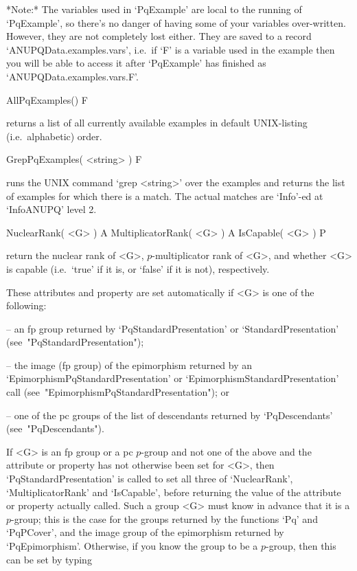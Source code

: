 *Note:*
The  variables  used  in  `PqExample'  are  local  to  the   running   of
`PqExample', so there's no  danger  of  having  some  of  your  variables
over-written. However, they are not  completely  lost  either.  They  are
saved to a record `ANUPQData.examples.vars', i.e.~if `F'  is  a  variable
used in the example then you will be able to access it after  `PqExample'
has finished as `ANUPQData.examples.vars.F'.

\>AllPqExamples() F

returns  a  list  of  all  currently  available   examples   in   default
UNIX-listing (i.e.~alphabetic) order.

\>GrepPqExamples( <string> ) F

runs the UNIX command `grep <string>'  over  the  {\ANUPQ}  examples  and
returns the list of examples for which  there  is  a  match.  The  actual
matches are `Info'-ed at `InfoANUPQ' level 2.


\>NuclearRank( <G> ) A
\>MultiplicatorRank( <G> ) A
\>IsCapable( <G> ) P

return the nuclear rank  of  <G>,  $p$-multiplicator  rank  of  <G>,  and
whether <G> is capable (i.e.~`true' if it is, or `false' if it  is  not),
respectively.

These attributes and property are set automatically if <G> is one of  the
following:

\beginlist%

\item{--}  an  fp   group   returned   by   `PqStandardPresentation'   or
`StandardPresentation' (see~"PqStandardPresentation");

\item{--} the  image  (fp  group)  of  the  epimorphism  returned  by  an
`EpimorphismPqStandardPresentation' or  `EpimorphismStandardPresentation'
call (see~"EpimorphismPqStandardPresentation"); or

\item{--} one of the pc groups of the list  of  descendants  returned  by
`PqDescendants' (see~"PqDescendants").

\endlist

If <G> is an fp group or a pc $p$-group and not one of the above and
the attribute or property has not otherwise been set for <G>, then
`PqStandardPresentation' is called to set all three of `NuclearRank',
`MultiplicatorRank' and `IsCapable', before returning the value of the
attribute or property actually called.  Such a group <G> must know in
advance that it is a $p$-group; this is the case for the groups
returned by the functions `Pq' and `PqPCover', and the image group of
the epimorphism returned by `PqEpimorphism'.  Otherwise, if you know
the group to be a $p$-group, then this can be set by typing 

